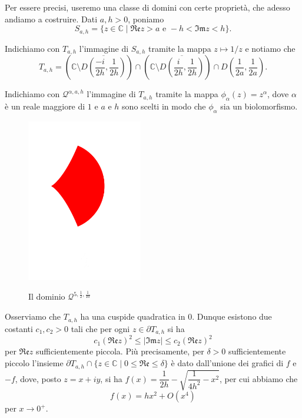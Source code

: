 Per essere precisi, useremo una classe di domini con certe proprietà, che adesso andiamo a costruire. Dati $a,h>0$, poniamo
$$S_{a,h}=\{z\in\mathbb{C}\mid\mathfrak{Re}z>a\text{ e }-h<\mathfrak{Im}z<h\}.$$

Indichiamo con $T_{a,h}$ l'immagine di $S_{a,h}$ tramite la mappa $z\longmapsto 1/z$ e notiamo che
$$T_{a,h}=\left(\mathbb{C}\setminus\overline{D\left(\frac{-i}{2h},\frac{1}{2h}\right)}\right)\cap\left(\mathbb{C}\setminus\overline{D\left(\frac{i}{2h},\frac{1}{2h}\right)}\right)\cap D\left(\frac{1}{2a},\frac{1}{2a}\right).$$

Indichiamo con $\mathcal{Q}^{\alpha,a,h}$ l'immagine di $T_{a,h}$ tramite la mappa $\phi_\alpha(z)=z^{\alpha}$, dove $\alpha$ è un reale maggiore di $1$ e $a$ e $h$ sono scelti in modo che $\phi_\alpha$ sia un biolomorfismo.

\begin{figure}[h!]
    \begin{center}
        \includegraphics[width=0.45\textwidth, trim=0 1cm 0 0]{Immagini/qalphaah.pdf} \\
        \caption{Il dominio $\mathcal{Q}^{5,\frac{1}{2},\frac{1}{10}}$}
    \end{center}
\end{figure}

Osserviamo che $T_{a,h}$ ha una cuspide quadratica in $0$. Dunque esistono due costanti $c_1,c_2>0$ tali che per ogni $z\in\partial T_{a,h}$ si ha
\begin{equation} \label{cusp_estimate}
    c_1(\mathfrak{Re}z)^2 \le |\mathfrak{Im}z| \le c_2(\mathfrak{Re}z)^2
\end{equation}
per $\mathfrak{Re}z$ sufficientemente piccola. Più precisamente, per $\delta>0$ sufficientemente piccolo l'insieme $\partial T_{a,h}\cap\{z\in\mathbb{C}\mid 0 \le \mathfrak{Re}\le\delta\}$ è dato dall'unione dei grafici di $f$ e $-f$, dove, posto $z=x+iy$, si ha $f(x)=\dfrac{1}{2h}-\sqrt{\dfrac{1}{4h^2}-x^2}$, per cui abbiamo che
\begin{equation} \label{cerchio}
    f(x)=hx^2+O(x^4)
\end{equation}
per $x\longrightarrow0^+$.

